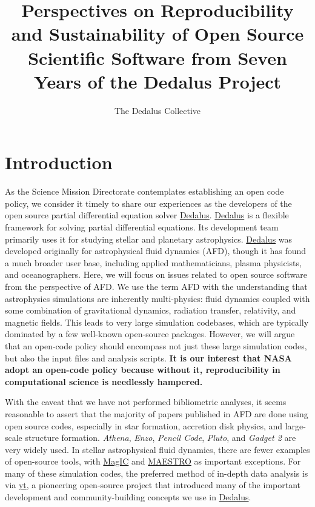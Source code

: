 \documentclass[12pt, preprint]{aastex}
\title{Perspectives on Reproducibility and Sustainability of Open Source Scientific Software from Seven Years of the Dedalus Project}
\author{The Dedalus Collective}
\newcommand{\dedalus}{\href{http://dedalus-project.org}{Dedalus}}
\begin{document}
\maketitle

\section{Introduction}
\label{sec:intro}
As the Science Mission Directorate contemplates establishing an open code policy, we consider it timely to share our experiences as the developers of the open source partial differential equation solver \dedalus{}. \dedalus{} is a flexible framework for solving partial differential equations. Its development team primarily uses it for studying stellar and planetary astrophysics.  \dedalus{} was developed originally for astrophysical fluid dynamics (AFD), though it has found a much broader user base, including applied mathematicians, plasma physicists, and oceanographers. Here, we will focus on issues related to open source software from the perspective of AFD. We use the term AFD with the understanding that astrophysics simulations are inherently multi-physics: fluid dynamics coupled with some combination of gravitational dynamics, radiation transfer, relativity, and magnetic fields. This leads to very large simulation codebases, which are typically dominated by a few well-known open-source packages. However, we will argue that an open-code policy should encompass not just these large simulation codes, but also the input files and analysis scripts. \textbf{It is our interest that NASA adopt an open-code policy because without it, reproducibility in computational science is needlessly hampered.} 

With the caveat that we have not performed bibliometric analyses, it seems reasonable to assert that the majority of papers published in AFD are done using open source codes, especially in star formation, accretion disk physics, and large-scale structure formation. \emph{Athena}, \emph{Enzo}, \emph{Pencil Code}, \emph{Pluto}, and \emph{Gadget 2} are very widely used. In stellar astrophysical fluid dynamics, there are fewer examples of open-source tools, with \href{http://magic-sph.github.io}{MagIC} and \href{http://amrex-astro.github.io/MAESTRO/}{MAESTRO} as important exceptions. For many of these simulation codes, the preferred method of in-depth data analysis is via \href{http://yt-project.org}{yt}, a pioneering open-source project that introduced many of the important development and community-building concepts we use in \dedalus{}. 
\end{document}
